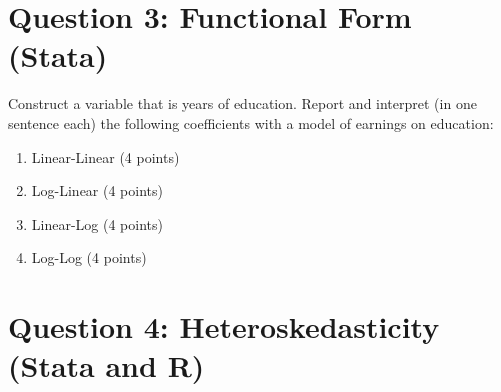 \documentclass{article}
\begin{document}
\section{Question 3:  Functional Form (Stata)}
Construct a variable that is years of education. Report and interpret (in one sentence each) the following coefficients with a model of earnings on education:

\begin{enumerate}[label=\alph*]

\item Linear-Linear (4 points)
\item Log-Linear (4 points)
\item Linear-Log (4 points)
\item Log-Log (4 points)

\end{enumerate}

\section{Question 4:  Heteroskedasticity (Stata and R)}
\end{document}

